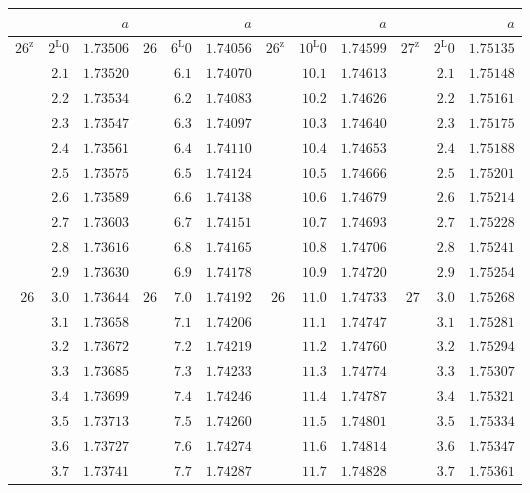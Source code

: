 \begin{center}
{{\begin{minipage}[t][500pt][t]{.96\linewidth}
{\fontsize{9}{10.2}\selectfont\setlength{\tabcolsep}{3pt}
\begin{tabular}{rr|r||rr|r||rr|r||rr|r}
&&$a$&&&$a$&&&$a$&&&$a$\\\hline
$26^{\mathrm{z}}$ & $2^{\mathrm{L}}0$ & $1.73506$ & $26$ & $6^{\mathrm{L}}0$ & $1.74056$ & $26^{\mathrm{z}}$ & $10^{\mathrm{L}}0$ & $1.74599$ & $27^{\mathrm{z}}$ & $2^{\mathrm{L}}0$ & $1.75135$\\
 & $2.1$ & $1.73520$ &  & $6.1$ & $1.74070$ &  & $10.1$ & $1.74613$ &  & $2.1$ & $1.75148$\\
 & $2.2$ & $1.73534$ &  & $6.2$ & $1.74083$ &  & $10.2$ & $1.74626$ &  & $2.2$ & $1.75161$\\
 & $2.3$ & $1.73547$ &  & $6.3$ & $1.74097$ &  & $10.3$ & $1.74640$ &  & $2.3$ & $1.75175$\\
 & $2.4$ & $1.73561$ &  & $6.4$ & $1.74110$ &  & $10.4$ & $1.74653$ &  & $2.4$ & $1.75188$\\
 & $2.5$ & $1.73575$ &  & $6.5$ & $1.74124$ &  & $10.5$ & $1.74666$ &  & $2.5$ & $1.75201$\\
 & $2.6$ & $1.73589$ &  & $6.6$ & $1.74138$ &  & $10.6$ & $1.74679$ &  & $2.6$ & $1.75214$\\
 & $2.7$ & $1.73603$ &  & $6.7$ & $1.74151$ &  & $10.7$ & $1.74693$ &  & $2.7$ & $1.75228$\\
 & $2.8$ & $1.73616$ &  & $6.8$ & $1.74165$ &  & $10.8$ & $1.74706$ &  & $2.8$ & $1.75241$\\
 & $2.9$ & $1.73630$ &  & $6.9$ & $1.74178$ &  & $10.9$ & $1.74720$ &  & $2.9$ & $1.75254$\\[4pt]
$26$ & $3.0$ & $1.73644$ & $26$ & $7.0$ & $1.74192$ & $26$ & $11.0$ & $1.74733$ & $27$ & $3.0$ & $1.75268$\\
 & $3.1$ & $1.73658$ &  & $7.1$ & $1.74206$ &  & $11.1$ & $1.74747$ &  & $3.1$ & $1.75281$\\
 & $3.2$ & $1.73672$ &  & $7.2$ & $1.74219$ &  & $11.2$ & $1.74760$ &  & $3.2$ & $1.75294$\\
 & $3.3$ & $1.73685$ &  & $7.3$ & $1.74233$ &  & $11.3$ & $1.74774$ &  & $3.3$ & $1.75307$\\
 & $3.4$ & $1.73699$ &  & $7.4$ & $1.74246$ &  & $11.4$ & $1.74787$ &  & $3.4$ & $1.75321$\\
 & $3.5$ & $1.73713$ &  & $7.5$ & $1.74260$ &  & $11.5$ & $1.74801$ &  & $3.5$ & $1.75334$\\
 & $3.6$ & $1.73727$ &  & $7.6$ & $1.74274$ &  & $11.6$ & $1.74814$ &  & $3.6$ & $1.75347$\\
 & $3.7$ & $1.73741$ &  & $7.7$ & $1.74287$ &  & $11.7$ & $1.74828$ &  & $3.7$ & $1.75361$\\

\end{tabular}}
\end{minipage}}}
\end{center}
